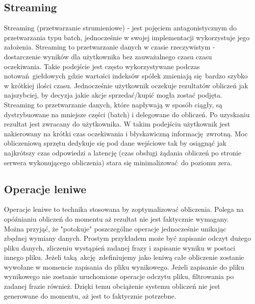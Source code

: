 \subsection{Streaming}\label{streaming_subsection}
Streaming (przetwarzanie strumieniowe) - jest pojęciem antagonistycznym do przetwarzania typu batch, jednocześnie w swojej implementacji wykorzystuje jego założenia. Streaming to przetwarzanie danych w czasie rzeczywistym - dostarczenie wyników dla użytkownika bez zauważalnego czasu czasu oczekiwania. Takie podejście jest często wykorzystywane podczas notowań giełdowych gdzie wartości indeksów spółek zmieniają się bardzo szybko w krótkiej ilości czasu. Jednocześnie użytkownik oczekuje rezultatów obliczeń jak najszybciej, by decyzja jakie akcje sprzedać/kupić mogła zostać podjęta. Streaming to przetwarzanie danych, które napływają w sposób ciągły, są dystrybuowane na mniejsze części (batch) i delegowane do obliczeń. Po uzyskaniu rezultat jest zwracany do użytkownika. W takim podejściu użytkownik jest nakierowany na krótki czas oczekiwania i błyskawiczną informację zwrotną. Moc obliczeniową sprzętu dedykuje się pod dane wejściowe tak by osiągnąć jak najkrótszy czas odpowiedzi a latencję (czas obsługi żądania obliczeń po stronie serwera wykonującego obliczenia) stara się minimalizować do poziomu zera.
\subsection{Operacje leniwe}
Operacje leniwe to technika stosowana by zoptymalizować obliczenia. Polega na opóźnianiu obliczeń do momentu aż rezultat nie jest faktycznie wymagany. Można przyjąć, że "potokuje" poszczególne operacje jednocześnie unikając zbędnej wymiany danych. Prostym przykładem może być zapisanie odczyt dużego pliku danych, zliczeniu wystąpień zadanej frazy i zapisanie wyniku w postaci innego pliku. Jeżeli taką akcję zdefiniujemy jako leniwą całe obliczenie zostanie wywołane w momencie zapisania do pliku wynikowego. Jeżeli zapisanie do pliku wynikowego nie zostanie uruchomione operacje odczytu pliku, filtrowania po zadanej frazie również. Dzięki temu obciążenie systemu obliczeń nie jest generowane do momentu, aż jest to faktycznie potrzebne. 

